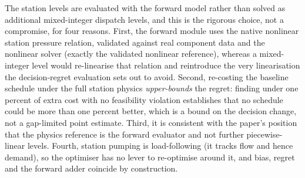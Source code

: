 \documentclass[a4paper,fleqn]{cas-sc}
\begin{document}
The station levels are evaluated with the forward model rather than solved as additional
mixed-integer dispatch levels, and this is the rigorous choice, not a compromise, for four
reasons. First, the forward module uses the native nonlinear station pressure relation,
validated against real component data and the nonlinear solver (exactly the validated
nonlinear reference), whereas a mixed-integer level would re-linearise
that relation and reintroduce the very linearisation the decision-regret evaluation sets out to avoid. Second,
re-costing the baseline schedule under the full station physics \emph{upper-bounds} the regret:
finding under one percent of extra cost with no feasibility violation establishes that no schedule
could be more than one percent better, which is a bound on the decision change, not a
gap-limited point estimate. Third, it is consistent with the paper's position that the physics
reference is the forward evaluator and not further piecewise-linear levels. Fourth, station
pumping is load-following (it tracks flow and hence demand), so the optimiser has no lever to
re-optimise around it, and bias, regret and the forward adder coincide by construction.
\end{document}
